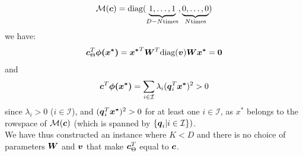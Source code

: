 \documentclass{exam}
\begin{document}
\begin{questions}
        \[
            \mathcal{M}(\vb*{c}) = \text{diag}(\underbrace{1, \dots, 1}_{D - N \text{times}}, \underbrace{0, \dots, 0}_{N \text{times}}) 
        \]
        we have:
        \[
            \vb*{c}^T_{\Theta} \vb*{\phi(x^*)}
            = \vb*{x^*}^T \vb*{W}^T \text{diag}(\vb*{v}) \vb*{Wx^*} = \vb*{0}
        \]
        and
        \[
            \vb*{c}^T \vb*{\phi(x^*)} = \sum_{i \in \mathcal{I}} \lambda_i (\vb*{q}_i^T\vb*{x^*})^2 > 0
        \]
        since $\lambda_i > 0$ ($i \in \mathcal{I}$), and $(\vb*{q}_i^T\vb*{x^*})^2 > 0$ for at least one $i \in \mathcal{I}$, as $x^*$ belongs to the rowspace of $ \mathcal{M}(\vb*{c})$ (which is spanned by $\{\vb*{q}_i | i \in \mathcal{I}\})$.\\
        We have thus constructed an instance where $K < D$ and there is no choice of parameters $\vb*{W}$ and $\vb*{v}$ that make $\vb*{c}^T_{\Theta}$ equal to $\vb*{c}$.
        \question
    \end{questions}
\end{document}
